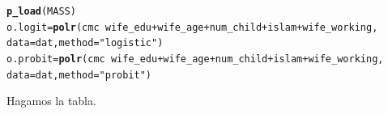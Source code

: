 \documentclass[onesided]{article}\usepackage[]{graphicx}\usepackage[]{color}
\makeatletter
\newcommand{\hlstr}[1]{\textcolor[rgb]{0.192,0.494,0.8}{#1}}%
\newcommand{\hlopt}[1]{\textcolor[rgb]{0,0,0}{#1}}%
\newcommand{\hlstd}[1]{\textcolor[rgb]{0.345,0.345,0.345}{#1}}%
\newcommand{\hlkwb}[1]{\textcolor[rgb]{0.69,0.353,0.396}{#1}}%
\newcommand{\hlkwc}[1]{\textcolor[rgb]{0.333,0.667,0.333}{#1}}%
\newcommand{\hlkwd}[1]{\textcolor[rgb]{0.737,0.353,0.396}{\textbf{#1}}}%
\newenvironment{kframe}{%
 \def\at@end@of@kframe{}%
 \ifinner\ifhmode%
  \def\at@end@of@kframe{\end{minipage}}%
  \begin{minipage}{\columnwidth}%
 \fi\fi%
 \def\FrameCommand##1{\hskip\@totalleftmargin \hskip-\fboxsep
 \colorbox{shadecolor}{##1}\hskip-\fboxsep
     \hskip-\linewidth \hskip-\@totalleftmargin \hskip\columnwidth}%
 \MakeFramed {\advance\hsize-\width
   \@totalleftmargin\z@ \linewidth\hsize
   \@setminipage}}%
 {\par\unskip\endMakeFramed%
 \at@end@of@kframe}
\newenvironment{knitrout}{}{} %
\makeatother
\begin{document}
\begin{knitrout}
\color{fgcolor}\begin{kframe}
\begin{alltt}
\hlkwd{p_load}\hlstd{(MASS)}
\hlstd{o.logit} \hlkwb{=} \hlkwd{polr}\hlstd{(cmc} \hlopt{~} \hlstd{wife_edu} \hlopt{+} \hlstd{wife_age} \hlopt{+} \hlstd{num_child} \hlopt{+} \hlstd{islam} \hlopt{+} \hlstd{wife_working,}
\hlkwc{data} \hlstd{= dat,} \hlkwc{method} \hlstd{=} \hlstr{"logistic"}\hlstd{)}
\hlstd{o.probit} \hlkwb{=} \hlkwd{polr}\hlstd{(cmc} \hlopt{~} \hlstd{wife_edu} \hlopt{+} \hlstd{wife_age} \hlopt{+} \hlstd{num_child} \hlopt{+} \hlstd{islam} \hlopt{+} \hlstd{wife_working,}
\hlkwc{data} \hlstd{= dat,} \hlkwc{method} \hlstd{=} \hlstr{"probit"}\hlstd{)}
\end{alltt}
\end{kframe}
\end{knitrout}

Hagamos la tabla.
\end{document}
